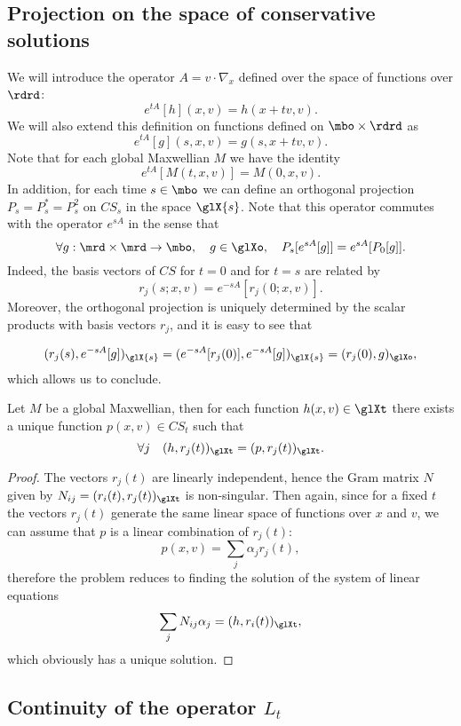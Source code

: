 \subsection{Projection on the space of conservative solutions} %
\label{sub:projector_on_the_space_of_conservative_solutions}
We will introduce the operator $A=v\cdot\nabla_x $
defined over the space of functions over $\rdrd$:
\[e^{tA}[h](x,v)=h(x+tv,v).\]
We will also extend this definition on functions defined on $\mbo\times\rdrd $ as
\[e^{tA}[g](s,x,v)=g(s,x+tv,v).\] Note that for each global Maxwellian $M$ we have the identity
\[e^{ tA}[M(t,x,v) ]=M(0,x,v).\]
In addition, for each time $s\in\mbo$ we can define an orthogonal projection $P_s=P_s^*=P_s^2$ on $CS_s$ in the space $\glX{s}$.
Note that this operator commutes with the operator $e^{sA}$ in the sense that
\[
	\forall g:\mrd\times\mrd\to\mbo,\quad g\in \glXo,\quad P_s[e^{sA}[g]]=e^{sA}[P_0[g]].	
\]
Indeed, the basis vectors of $CS$ for $t=0$ and for $t=s$ are related by
\[r_j(s;x,v)=e^{-sA}[r_j(0;x,v)].\] Moreover, the orthogonal projection is uniquely determined by the scalar products with basis vectors $r_j$, and it is easy to see that

\[(r_j(s),e^{-sA}[g])_{\glX{s}} = (e^{-sA}[r_j(0)],e^{-sA}[g])_{\glX{s}}=(r_j(0),g)_{\glXo}, \]
which allows us to conclude.

\begin{lemma}
	\label{le:CS-invert}
	Let $M$ be a global Maxwellian, then for each function $h(x,v)\in \glXt$ there exists a unique function $p(x,v)\in CS_t$ such that
	\[\forall j\quad (h,r_j(t))_{\glXt}=(p,r_j(t))_{\glXt}.\]
\end{lemma}
\begin{proof}
	The vectors $r_j(t)$ are linearly independent, hence the Gram matrix $N$ given by $N_{ij}=(r_i(t),r_j(t))_{\glXt}$ is non-singular. Then again, since for a fixed $t$ the vectors $r_j(t)$ generate the same linear space of functions over $x$ and $v$, we can assume that $p$ is a linear combination of $r_j(t)$:
	\[p(x,v)=\sum_j \alpha_jr_j(t),\] therefore the problem reduces to finding the solution of the system of linear equations \[ \sum_jN_{ij}\alpha_j=(h,r_i(t))_{\glXt},\]
	which obviously has a unique solution.
\end{proof}





\subsection{Continuity of the operator $L_t$} %
\label{sub:continuity_of_the_operator_Lt}


